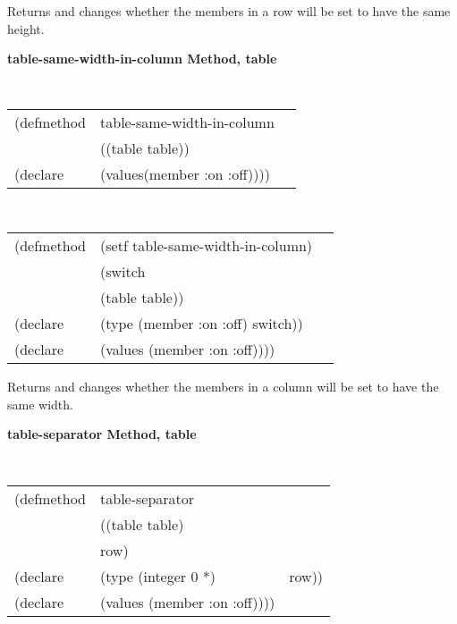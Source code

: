 \begin{flushright} \parbox[t]{6.125in}{
Returns and changes whether the members in a row will be
set to have the same height.

}\end{flushright}

	  
{\samepage
{\large {\bf table-same-width-in-column \hfill Method, table}}
\begin{flushright} \parbox[t]{6.125in}{
\tt
\begin{tabular}{lll}
\raggedright
(defmethod & table-same-width-in-column & \\
& ((table  table)) \\
(declare & (values(member :on :off))))
\end{tabular}
\rm

}\end{flushright}}

{\samepage
\begin{flushright} \parbox[t]{6.125in}{
\tt
\begin{tabular}{lll}
\raggedright
(defmethod & (setf table-same-width-in-column) & \\
         & (switch \\
         & (table table)) \\
(declare &(type (member :on :off)  switch))\\
(declare & (values (member :on :off))))
\end{tabular}
\rm
}
\end{flushright}}


\begin{flushright} \parbox[t]{6.125in}{
Returns and changes whether the members in a column will be
set to have the same width.


}\end{flushright}

{\samepage
{\large {\bf table-separator \hfill Method, table}}
\label{page:table-separator}
\begin{flushright} \parbox[t]{6.125in}{
\tt
\begin{tabular}{lll}
\raggedright
(defmethod & table-separator & \\
           & ((table  table)\\
           & row) \\
(declare &(type (integer 0 *) & row))\\
(declare   & (values (member :on :off))))
\end{tabular}
\rm

}\end{flushright}}

